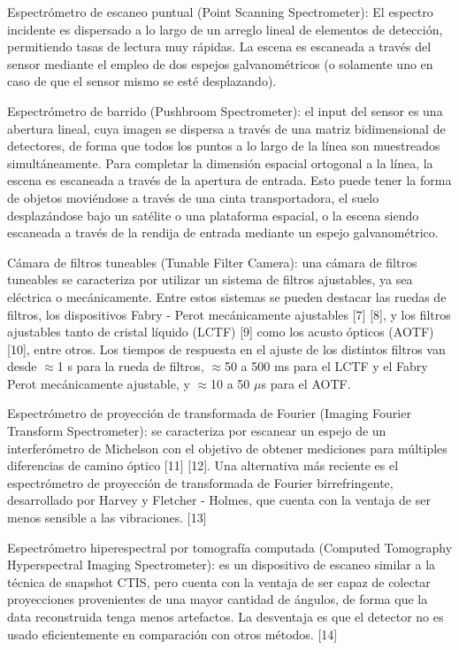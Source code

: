 \documentclass{ctuthesis}
\begin{document}
Espectrómetro de escaneo puntual (Point Scanning Spectrometer): El espectro incidente es dispersado a lo largo de un arreglo lineal de elementos de detección, permitiendo tasas de lectura muy rápidas. La escena es escaneada  a través del sensor mediante el empleo de dos espejos galvanométricos (o solamente uno en caso de que el sensor mismo se esté desplazando).

Espectrómetro de barrido (Pushbroom Spectrometer): el input del sensor es una abertura lineal, cuya imagen se dispersa a través de una matriz bidimensional de detectores, de forma que todos los puntos a lo largo de la línea son muestreados simultáneamente. Para completar la dimensión espacial ortogonal a la línea, la escena es escaneada a través de la apertura de entrada. Esto puede tener la forma de objetos moviéndose a través de una cinta transportadora, el suelo desplazándose bajo un satélite o una plataforma espacial, o la escena siendo escaneada a través de la rendija de entrada mediante un espejo galvanométrico.

Cámara de filtros tuneables (Tunable Filter Camera): una cámara de filtros tuneables se caracteriza por utilizar un sistema de filtros ajustables, ya sea eléctrica o mecánicamente. Entre estos sistemas se pueden destacar las ruedas de filtros, los dispositivos Fabry - Perot mecánicamente ajustables [7] [8], y los filtros ajustables tanto de cristal líquido (LCTF) [9] como los acusto ópticos (AOTF) [10], entre otros. Los tiempos de respuesta en el ajuste de los distintos filtros van desde $\approx$1 s para la rueda de filtros, $\approx$50 a 500 ms para el LCTF y el Fabry Perot mecánicamente ajustable, y $\approx$10 a 50 $\mu$s para el AOTF.

Espectrómetro de proyección de transformada de Fourier (Imaging Fourier Transform Spectrometer): se caracteriza por escanear un espejo de un interferómetro de Michelson con el objetivo de obtener mediciones para múltiples diferencias de camino óptico [11] [12]. Una alternativa más reciente es el espectrómetro de proyección de transformada de Fourier birrefringente, desarrollado por Harvey y Fletcher - Holmes, que cuenta con la ventaja de ser menos sensible a las vibraciones. [13]

Espectrómetro hiperespectral por tomografía computada (Computed Tomography Hyperspectral Imaging Spectrometer): es un dispositivo de escaneo similar a la técnica de snapshot CTIS, pero cuenta con la ventaja de ser capaz de colectar proyecciones provenientes de una mayor cantidad de ángulos, de forma que la data reconstruida tenga menos artefactos. La desventaja es que el detector no es usado eficientemente en comparación con otros métodos. [14]
\end{document}

